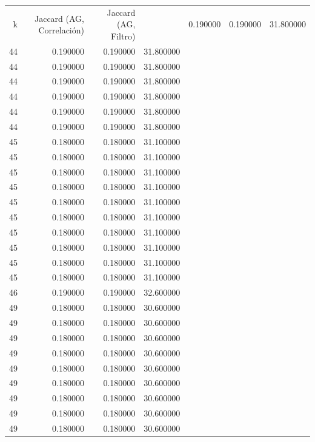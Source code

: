 \begin{tabular}{rrrr}
\toprule
k & Jaccard (AG, Correlación) & Jaccard (AG, Filtro) & %
 & 0.190000 & 0.190000 & 31.800000 \\
44 & 0.190000 & 0.190000 & 31.800000 \\
44 & 0.190000 & 0.190000 & 31.800000 \\
44 & 0.190000 & 0.190000 & 31.800000 \\
44 & 0.190000 & 0.190000 & 31.800000 \\
44 & 0.190000 & 0.190000 & 31.800000 \\
44 & 0.190000 & 0.190000 & 31.800000 \\
45 & 0.180000 & 0.180000 & 31.100000 \\
45 & 0.180000 & 0.180000 & 31.100000 \\
45 & 0.180000 & 0.180000 & 31.100000 \\
45 & 0.180000 & 0.180000 & 31.100000 \\
45 & 0.180000 & 0.180000 & 31.100000 \\
45 & 0.180000 & 0.180000 & 31.100000 \\
45 & 0.180000 & 0.180000 & 31.100000 \\
45 & 0.180000 & 0.180000 & 31.100000 \\
45 & 0.180000 & 0.180000 & 31.100000 \\
45 & 0.180000 & 0.180000 & 31.100000 \\
46 & 0.190000 & 0.190000 & 32.600000 \\
49 & 0.180000 & 0.180000 & 30.600000 \\
49 & 0.180000 & 0.180000 & 30.600000 \\
49 & 0.180000 & 0.180000 & 30.600000 \\
49 & 0.180000 & 0.180000 & 30.600000 \\
49 & 0.180000 & 0.180000 & 30.600000 \\
49 & 0.180000 & 0.180000 & 30.600000 \\
49 & 0.180000 & 0.180000 & 30.600000 \\
49 & 0.180000 & 0.180000 & 30.600000 \\
49 & 0.180000 & 0.180000 & 30.600000 \\
\bottomrule
\end{tabular}
